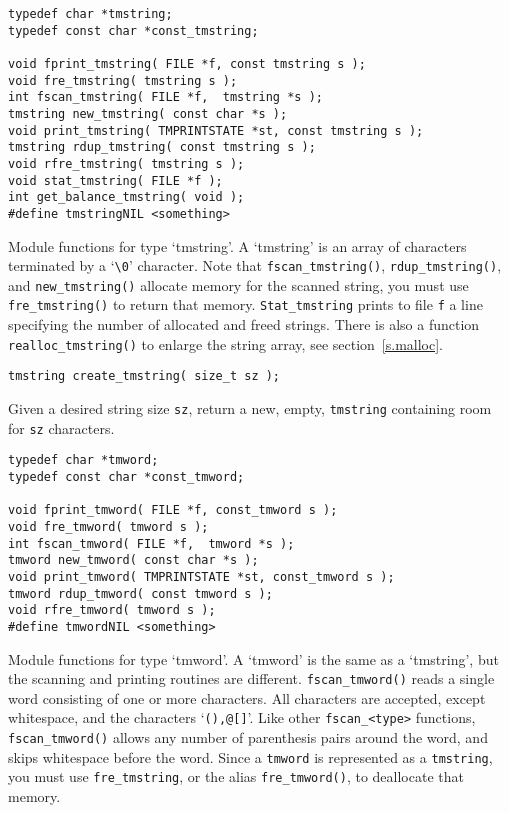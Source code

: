 \begin{verbatim}
typedef char *tmstring;
typedef const char *const_tmstring;

void fprint_tmstring( FILE *f, const tmstring s );
void fre_tmstring( tmstring s );
int fscan_tmstring( FILE *f,  tmstring *s );
tmstring new_tmstring( const char *s );
void print_tmstring( TMPRINTSTATE *st, const tmstring s );
tmstring rdup_tmstring( const tmstring s );
void rfre_tmstring( tmstring s );
void stat_tmstring( FILE *f );
int get_balance_tmstring( void );
#define tmstringNIL <something>
\end{verbatim}
\begin{desc}
Module functions for type `tmstring'.
A `tmstring' is an array of characters terminated by a `\verb+\0+' character.
Note that \texttt{fscan\_tmstring()}, \texttt{rdup\_tmstring()},
and \texttt{new\_tmstring()} allocate memory for the scanned string,
you must use \texttt{fre\_tmstring()} to return that memory.
\texttt{Stat\_tmstring} prints to file \texttt{f} a line specifying the number of
allocated and freed strings.
There is also a function \verb+realloc_tmstring()+ to enlarge the
string array,
see section~\ref{s.malloc}.
\end{desc}
\begin{verbatim}
tmstring create_tmstring( size_t sz );
\end{verbatim}
\begin{desc}
Given a desired string size \verb'sz', return a new, empty, \texttt{tmstring}
containing room for \verb'sz' characters.
\end{desc}
\begin{verbatim}
typedef char *tmword;
typedef const char *const_tmword;

void fprint_tmword( FILE *f, const_tmword s );
void fre_tmword( tmword s );
int fscan_tmword( FILE *f,  tmword *s );
tmword new_tmword( const char *s );
void print_tmword( TMPRINTSTATE *st, const_tmword s );
tmword rdup_tmword( const tmword s );
void rfre_tmword( tmword s );
#define tmwordNIL <something>
\end{verbatim}
\begin{desc}
Module functions for type `tmword'.
A `tmword' is the same as a `tmstring', but the scanning and printing
routines are different. \verb'fscan_tmword()' reads a single word
consisting of one or more characters. All characters are accepted,
except whitespace, and the characters `\verb'(),@[]''.
Like other \verb'fscan_<type>' functions, \verb'fscan_tmword()' allows
any number of parenthesis pairs around the word, and skips
whitespace before the word.
Since a \verb'tmword' is represented as a \verb'tmstring',
you must use \verb'fre_tmstring', or the alias \texttt{fre\_tmword()},
to deallocate that memory.
\end{desc}
